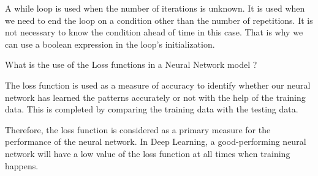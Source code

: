 \documentclass[12pt,a4paper]{exam}
\begin{document}
\begin{questions}
\begin{solution}
A while loop is used when the number of iterations is unknown. It is used when we need to end the loop on a condition other than the number of repetitions. It is not necessary to know the condition ahead of time in this case. That is why we can use a boolean expression in the loop's initialization.
\end{solution}

\question
What is the use of the Loss functions in a Neural Network model ?
\fillwithlines{3cm}
\begin{solution}
The loss function is used as a measure of accuracy to identify whether our neural network has learned the patterns accurately or not with the help of the training data.
This is completed by comparing the training data with the testing data.

Therefore, the loss function is considered as a primary measure for the performance of the neural network. In Deep Learning, a good-performing neural network will have a low value of the loss function at all times when training happens.
\end{solution}

\end{questions}
\end{document}
